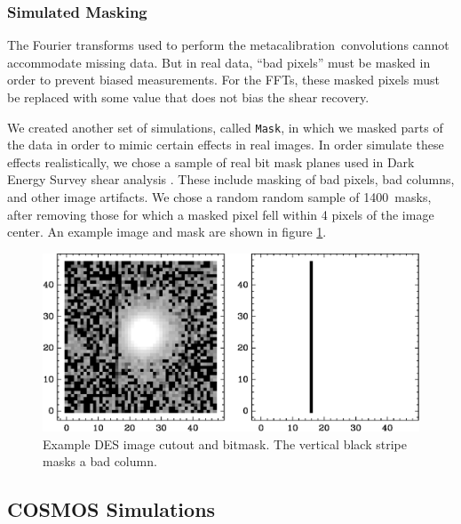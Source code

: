 \documentclass[usegraphicx,usenatbib]{mn2e}
\newcommand{\nmasks}{1400}
\newcommand{\mcal}{metacalibration}
\newcommand{\bdmask}{\texttt{Mask}}
\begin{document}
\subsubsection{Simulated Masking}

The Fourier transforms used to perform the \mcal\ convolutions cannot
accommodate missing data.  But in real data, ``bad pixels'' must be masked in
order to prevent biased measurements. For the FFTs, these masked pixels must be
replaced with some value that does not bias the shear recovery.

We created another set of simulations, called \bdmask, in which we masked
parts of the data in order to mimic certain effects in real images.  In order
simulate these effects realistically, we chose a sample of real bit mask planes
used in Dark Energy Survey shear analysis \citep{DESSVShear}.  These include
masking of bad pixels, bad columns, and other image artifacts.   We chose a random
random sample of \nmasks\ masks, after removing those for which a masked pixel
fell within 4 pixels of the image center.  An example image and mask are shown
in figure \ref{fig:mask}.

\begin{figure}
    \centering
    \includegraphics[scale=0.45]{DES2117+0126-bmask-021223.eps}

    \caption{Example DES image cutout and bitmask.  The vertical black stripe masks a
bad column. }

\label{fig:mask}
\end{figure}


\subsection{COSMOS Simulations}
\end{document}
